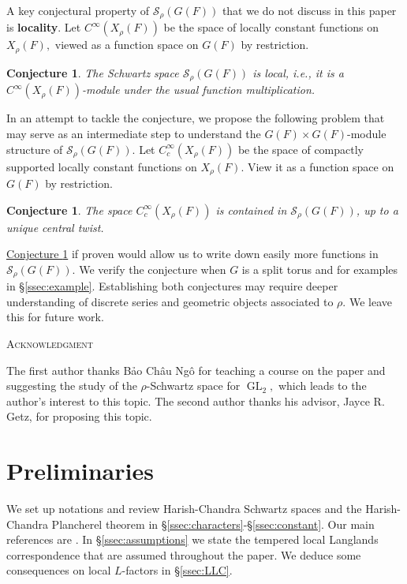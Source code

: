 \documentclass[10pt]{amsart}
\newtheorem{conjecture}[theorem]{Conjecture}
\theoremstyle{definition}
\numberwithin{equation}{section}
\DeclareMathOperator{\GL}{\mathrm{GL}}
\numberwithin{equation}{subsection}
\begin{document}
A key conjectural property of $\mathcal{S}_\rho(G(F))$ that we do not discuss in this paper is \textbf{locality}. Let $C^\infty(X_\rho(F))$ be the space of locally constant functions on $X_\rho(F),$ viewed as a function space on $G(F)$ by restriction.
\begin{conjecture}
    The Schwartz space $\mathcal{S}_\rho(G(F))$ is local, i.e., it is a $C^\infty(X_\rho(F))$-module under the usual function multiplication.
\end{conjecture}
In an attempt to tackle the conjecture, we propose the following problem that may serve as an intermediate step to understand the $G(F)\times G(F)$-module structure of $\mathcal{S}_\rho(G(F))$. Let $C^\infty_c(X_\rho(F))$ be the space of compactly supported locally constant functions on $X_\rho(F)$. View it as a function space on $G(F)$ by restriction.
\begin{conjecture}\label{conj:main:SES}
    The space $C^\infty_c(X_\rho(F))$ is contained in $\mathcal{S}_\rho(G(F))$, up to a unique central twist.
\end{conjecture}
\hyperref[conj:main:SES]{Conjecture \ref{conj:main:SES}} if proven would allow us to write down easily more functions in $\mathcal{S}_\rho(G(F)).$ We verify the conjecture when $G$ is a split torus and for examples in \S\ref{ssec:example}.  Establishing both conjectures may require deeper understanding of discrete series and geometric objects associated to $\rho$. We leave this for future work.



\vspace{0.2cm}
\begin{center}
    \textsc{Acknowledgment}
\end{center}
The first author thanks Bảo Ch\^au Ng\^o for teaching a course on the paper \cite{Luo:Ngo} and suggesting the study of the $\rho$-Schwartz space for $\GL_2,$ which leads to the author's interest to this topic.  
The second author thanks his advisor, Jayce R. Getz, for proposing this topic.






\section{Preliminaries}\label{sec:prelim}

We set up notations and review Harish-Chandra Schwartz spaces and the Harish-Chandra Plancherel theorem in \S \ref{ssec:characters}-\S \ref{ssec:constant}. Our main references are \cite{Waldspurger:Plancherel, Representation-p-adic}. In \S\ref{ssec:assumptions} we state the tempered local Langlands correspondence that are assumed throughout the paper. We deduce some consequences on local $L$-factors in \S\ref{ssec:LLC}. 
\end{document}
